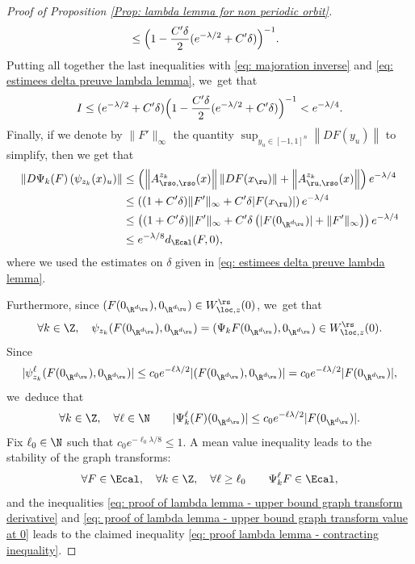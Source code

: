 \begin{appendix}
\begin{proof}[Proof of Proposition \ref{Prop: lambda lemma for non periodic orbit}]
\begin{align*}
&\leq \Bigl(1 - \frac{C' \delta}{2} (e^{- \lambda/2 } + C' \delta) \Bigr)^{-1}.
\end{align*}
Putting all together the last inequalities with \eqref{eq: majoration inverse} and \eqref{eq: estimees delta preuve lambda lemma}, we~get that
\[
I \leq (e^{-\lambda/ 2} + C' \delta) \Bigl(1 - \frac{C' \delta}{2} (e^{- \lambda/ 2} + C' \delta) \Bigr)^{-1} < e^{- \lambda / 4}.
\]
Finally, if we denote by $\|F'\|_{\infty}$ the quantity $\sup_{y_u \in [-1,1]^n}\left\| DF (y_u) \right\|$ to simplify, then we get that
\begin{equation}\label{eq: proof of lambda lemma - upper bound graph transform derivative}
\begin{split}
\left\| D \Psi_k (F) \left(\psi_{z_k} (x)_u \right) \right\| &\leq \left(\left\| A_{\rso,\rso}^{z_k} (x)\right\| \left\| DF (x_\ru) \right\| + \left\| A_{\ru,\rso}^{z_k} (x) \right\| \right) e^{- \lambda/4}\\
&\leq \left((1 + C' \delta) \|F'\|_{\infty} + C' \delta |F(x_\ru)| \right)e^{- \lambda/4} \\
&\leq \left((1 + C' \delta) \|F'\|_{\infty} + C' \delta \left(|F(0_{\R^{d_\ru}})| + \|F'\|_{\infty} \right) \right) e^{- \lambda / 4}
\\
&\leq e^{- \lambda /8} d_{\Ecal}(F, 0),
\end{split}
\end{equation}
where we used the estimates on $\delta$ given in \eqref{eq: estimees delta preuve lambda lemma}.

Furthermore, since $(F(0_{\R^{d_\ru}}), 0_{\R^{d_\ru}}) \in W_{\loc,z}^\rs (0)$, we~get that
\[
\forall k \in \Z, \quad \psi_{z_k} (F(0_{\R^{d_\ru}}), 0_{\R^{d_\ru}}) = (\Psi_k F (0_{\R^{d_\ru}}), 0_{\R^{d_\ru}}) \in W_{\loc,z}^\rs (0).
\]
Since
\[
| \psi_{z_k}^{\ell} (F(0_{\R^{d_\ru}}), 0_{\R^{d_\ru}})| \leq c_0 e^{- \ell \lambda / 2} | (F(0_{\R^{d_\ru}}), 0_{\R^{d_\ru}})| = c_0 e^{- \ell \lambda / 2} |F(0_{\R^{d_\ru}})|,
\]
we~deduce that
\begin{equation}\label{eq: proof of lambda lemma - upper bound graph transform value at 0}
\forall k \in \Z, \quad \forall \ell \in \N \qquad |\Psi_k^{\ell} (F) (0_{\R^{d_\ru}})| \leq c_0 e^{- \ell\lambda / 2} |F(0_{\R^{d_\ru}})|.
\end{equation}
Fix $\ell_0 \in \N$ such that $c_0 e^{-\ell_0 \lambda /8} \leq 1$. A mean value inequality leads to the stability of the graph transforms:
\begin{equation}\label{eq: proof of lambda lemma - stability of the graph transforms}
\forall F \in \Ecal, \quad \forall k \in \Z, \quad \forall \ell \geq \ell_0 \qquad \Psi_k^{\ell} F \in \Ecal,
\end{equation}
and the inequalities \eqref{eq: proof of lambda lemma - upper bound graph transform derivative} and \eqref{eq: proof of lambda lemma - upper bound graph transform value at 0} leads to the claimed inequality \eqref{eq: proof lambda lemma - contracting inequality}.


\end{proof}
\end{appendix}

